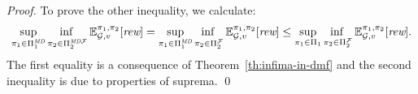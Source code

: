 \begin{proof}
To prove the other inequality, we calculate:
%
\[\adjustlimits \sup_{\strat{1} \in \DetMemorylessStrats{1}} \inf_{\strat{2} \in \DetMemorylessFairStrats{2}} \Expect{\strat{1}}{\strat{2}}_{\StochG,v}[\Rewards]
=  \adjustlimits \sup_{\strat{1} \in \DetMemorylessStrats{1}} \inf_{\strat{2} \in \FairStrats{2}} \Expect{\strat{1}}{\strat{2}}_{\StochG,v}[\Rewards]
\leq  \adjustlimits \sup_{\strat{1} \in \Strategies{1}} \inf_{\strat{2} \in \FairStrats{2}} \Expect{\strat{1}}{\strat{2}}_{\StochG,v}[\Rewards].
\]
%
  The first equality is a consequence of Theorem~\ref{th:infima-in-dmf} and the second inequality is due to properties of suprema.
\qed
\end{proof}





     
